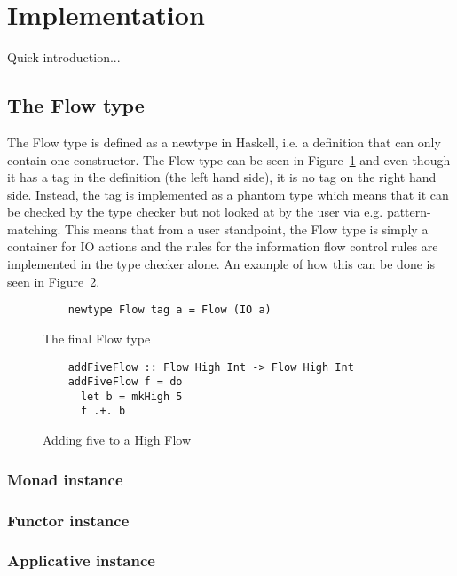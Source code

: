 \section{Implementation}
\label{chapter:implementation}
Quick introduction...
\subsection{The Flow type}
\label{sec:flow}
The Flow type is defined as a newtype in Haskell, i.e. a definition that can only contain one constructor. The Flow type can be seen in Figure~\ref{fig:final_flow} and even though it has a tag in the definition (the left hand side), it is no tag on the right hand side. Instead, the tag is implemented as a phantom type\cite{haskell_phantom} which means that it can be checked by the type checker but not looked at by the user via e.g. pattern-matching. This means that from a user standpoint, the Flow type is simply a container for IO actions and the rules for the information flow control rules are implemented in the type checker alone. An example of how this can be done is seen in Figure~\ref{fig:add_five_flow}.
\begin{figure}[h]
  \lstset{language=Haskell}
  \begin{lstlisting}
    newtype Flow tag a = Flow (IO a)
  \end{lstlisting}
  \caption{The final Flow type}
  \label{fig:final_flow}
\end{figure}
\begin{figure}[h]
  \lstset{language=Haskell}
  \begin{lstlisting}
    addFiveFlow :: Flow High Int -> Flow High Int
    addFiveFlow f = do
      let b = mkHigh 5
      f .+. b
  \end{lstlisting}
  \caption{Adding five to a High Flow}
  \label{fig:add_five_flow}
\end{figure}

\subsubsection{Monad instance}

\subsubsection{Functor instance}

\subsubsection{Applicative instance}

